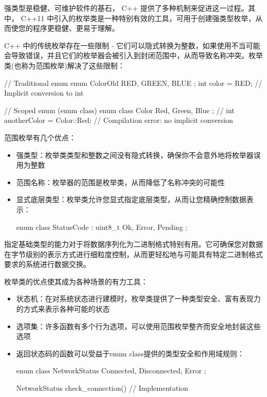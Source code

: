 强类型是稳健、可维护软件的基石， C++ 提供了多种机制来促进这一过程。其中， C++11 中引入的枚举类是一种特别有效的工具，可用于创建强类型枚举，从而使您的程序更稳健、更易于理解。


C++ 中的传统枚举存在一些限制 - 它们可以隐式转换为整数，如果使用不当可能会导致错误，并且它们的枚举器会被引入到封闭范围中，从而导致名称冲突。枚举类(也称为范围枚举)解决了这些限制：

\begin{cpp}
// Traditional enum
enum ColorOld { RED, GREEN, BLUE };
int color = RED; // Implicit conversion to int

// Scoped enum (enum class)
enum class Color { Red, Green, Blue };
// int anotherColor = Color::Red; // Compilation error: no implicit conversion
\end{cpp}


范围枚举有几个优点：

\begin{itemize}
\item
强类型：枚举类类型和整数之间没有隐式转换，确保你不会意外地将枚举器误用为整数

\item
范围名称：枚举器的范围是枚举类，从而降低了名称冲突的可能性

\item
显式底层类型：枚举类允许您显式指定底层类型，从而让您精确控制数据表示：

\begin{cpp}
enum class StatusCode : uint8_t { Ok, Error, Pending };
\end{cpp}
\end{itemize}

指定基础类型的能力对于将数据序列化为二进制格式特别有用。它可确保您对数据在字节级别的表示方式进行细粒度控制，从而更轻松地与可能具有特定二进制格式要求的系统进行数据交换。


枚举类的优点使其成为各种场景的有力工具：

\begin{itemize}
\item
状态机：在对系统状态进行建模时，枚举类提供了一种类型安全、富有表现力的方式来表示各种可能的状态

\item
选项集：许多函数有多个行为选项，可以使用范围枚举整齐而安全地封装这些选项

\item
返回状态码的函数可以受益于enum class提供的类型安全和作用域规则：

\begin{cpp}
enum class NetworkStatus { Connected, Disconnected, Error };

NetworkStatus check_connection() {
    // Implementation
}
\end{cpp}
\end{itemize}

